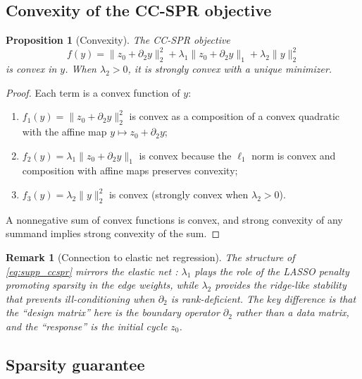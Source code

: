 \documentclass[11pt]{article}
\newtheorem{proposition}[theorem]{Proposition}
\newtheorem{remark}[theorem]{Remark}
\begin{document}
\subsection{Convexity of the CC-SPR objective}

\begin{proposition}[Convexity]\label{prop:supp_convex}
The CC-SPR objective
\begin{equation}\label{eq:supp_ccspr}
f(y) = \| z_0 + \partial_2 y \|_2^2 + \lambda_1 \| z_0 + \partial_2 y \|_1 + \lambda_2 \| y \|_2^2
\end{equation}
is convex in $y$. When $\lambda_2 > 0$, it is strongly convex with a unique minimizer.
\end{proposition}

\begin{proof}
Each term is a convex function of $y$:
\begin{enumerate}[leftmargin=1.5em]
\item $f_1(y) = \|z_0 + \partial_2 y\|_2^2$ is convex as a composition of a convex quadratic with the affine map $y \mapsto z_0 + \partial_2 y$;
\item $f_2(y) = \lambda_1 \|z_0 + \partial_2 y\|_1$ is convex because the $\ell_1$ norm is convex and composition with affine maps preserves convexity;
\item $f_3(y) = \lambda_2 \|y\|_2^2$ is convex (strongly convex when $\lambda_2 > 0$).
\end{enumerate}
A nonnegative sum of convex functions is convex, and strong convexity of any summand implies strong convexity of the sum.
\end{proof}

\begin{remark}[Connection to elastic net regression]\label{rem:supp_elasticnet}
The structure of \eqref{eq:supp_ccspr} mirrors the elastic net \cite{zou2005elasticnet}: $\lambda_1$ plays the role of the LASSO penalty promoting sparsity in the edge weights, while $\lambda_2$ provides the ridge-like stability that prevents ill-conditioning when $\partial_2$ is rank-deficient.
The key difference is that the ``design matrix'' here is the boundary operator $\partial_2$ rather than a data matrix, and the ``response'' is the initial cycle $z_0$.
\end{remark}

\subsection{Sparsity guarantee}
\end{document}
